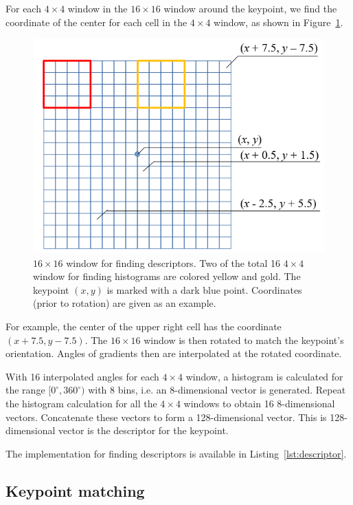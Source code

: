 \documentclass{ee208report}
\begin{document}
\begin{multicols*}{2}
For each $4 \times 4$ window in the $16 \times 16$ window around the keypoint,
we find the coordinate of the center for each cell in the $4 \times 4$ window,
as shown in Figure~\ref{fig:descriptor-window}.

\begin{figure}[H]
    \includegraphics[width=\linewidth]{images/descriptor_window.png}
    \caption{$16 \times 16$ window for finding descriptors. Two of the total 16
        $4 \times 4$ window for finding histograms are colored yellow and gold.
        The keypoint $(x, y)$ is marked with a dark blue point. Coordinates
        (prior to rotation) are given as an example.}
    \label{fig:descriptor-window}
\end{figure}

For example, the center of the upper right cell has the coordinate $(x + 7.5, y
- 7.5)$. The $16 \times 16$ window is then rotated to match the keypoint's
orientation. Angles of gradients then are interpolated at the rotated
coordinate.

With 16 interpolated angles for each $4 \times 4$ window, a histogram is
calculated for the range $[0^\circ, 360^\circ)$ with 8 bins, i.e. an
8-dimensional vector is generated. Repeat the histogram calculation for all the
$4 \times 4$ windows to obtain 16 8-dimensional vectors. Concatenate these
vectors to form a 128-dimensional vector. This is 128-dimensional vector is the
descriptor for the keypoint.

The implementation for finding descriptors is available in
Listing~\ref{lst:descriptor}.

\subsection{Keypoint matching}


\end{multicols*}
\end{document}
